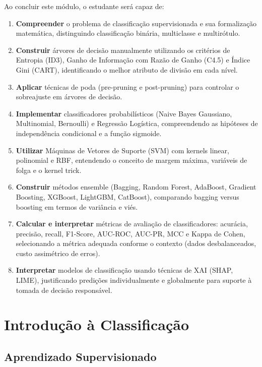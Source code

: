 \documentclass[12pt,a4paper]{article}
\begin{document}
Ao concluir este módulo, o estudante será capaz de:

\begin{enumerate}[leftmargin=2em,label=\textcolor{mineblue}{\faIcon{check-circle}}]
  \item \textbf{Compreender} o problema de classificação supervisionada e sua formalização matemática, distinguindo classificação binária, multiclasse e multirótulo.
  \item \textbf{Construir} árvores de decisão manualmente utilizando os critérios de Entropia (ID3), Ganho de Informação com Razão de Ganho (C4.5) e Índice Gini (CART), identificando o melhor atributo de divisão em cada nível.
  \item \textbf{Aplicar} técnicas de poda (pre-pruning e post-pruning) para controlar o sobreajuste em árvores de decisão.
  \item \textbf{Implementar} classificadores probabilísticos (Naive Bayes Gaussiano, Multinomial, Bernoulli) e Regressão Logística, compreendendo as hipóteses de independência condicional e a função sigmoide.
  \item \textbf{Utilizar} Máquinas de Vetores de Suporte (SVM) com kernels linear, polinomial e RBF, entendendo o conceito de margem máxima, variáveis de folga e o kernel trick.
  \item \textbf{Construir} métodos ensemble (Bagging, Random Forest, AdaBoost, Gradient Boosting, XGBoost, LightGBM, CatBoost), comparando bagging versus boosting em termos de variância e viés.
  \item \textbf{Calcular e interpretar} métricas de avaliação de classificadores: acurácia, precisão, recall, F1-Score, AUC-ROC, AUC-PR, MCC e Kappa de Cohen, selecionando a métrica adequada conforme o contexto (dados desbalanceados, custo assimétrico de erros).
  \item \textbf{Interpretar} modelos de classificação usando técnicas de XAI (SHAP, LIME), justificando predições individualmente e globalmente para suporte à tomada de decisão responsável.
\end{enumerate}

\section{Introdução à Classificação}

\subsection{Aprendizado Supervisionado}
\end{document}
